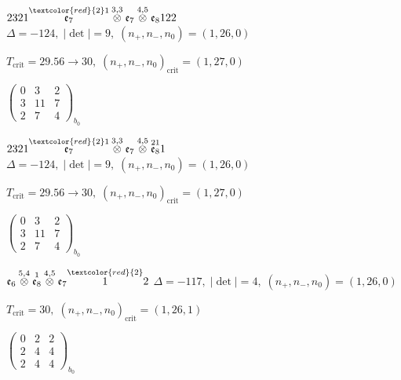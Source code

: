 \documentclass[10pt]{article}
\begin{document}
\smallskip

$2321\overset{\textcolor{red}{2}1}{\mathfrak{e}_7}\overset{3,3}{\otimes}\mathfrak{e}_7\overset{4,5}{\otimes}\mathfrak{e}_8122$ \quad $\Delta=-124,\; |\det|=9,\; (n_+,n_-,n_0)=(1,26,0)$

\hspace{1em}$T_{\text{crit}}=29.56 \to 30,\; (n_+,n_-,n_0)_{\text{crit}}=(1,27,0)$

\hspace{2em}$\left(\begin{smallmatrix}0 & 3 & 2 \\ 3 & 11 & 7 \\ 2 & 7 & 4\end{smallmatrix}\right)_{\!b_0}$

\smallskip

$2321\overset{\textcolor{red}{2}1}{\mathfrak{e}_7}\overset{3,3}{\otimes}\mathfrak{e}_7\overset{4,5}{\otimes}\overset{21}{\mathfrak{e}_8}1$ \quad $\Delta=-124,\; |\det|=9,\; (n_+,n_-,n_0)=(1,26,0)$

\hspace{1em}$T_{\text{crit}}=29.56 \to 30,\; (n_+,n_-,n_0)_{\text{crit}}=(1,27,0)$

\hspace{2em}$\left(\begin{smallmatrix}0 & 3 & 2 \\ 3 & 11 & 7 \\ 2 & 7 & 4\end{smallmatrix}\right)_{\!b_0}$

\smallskip

$\mathfrak{e}_6\overset{5,4}{\otimes}\overset{1}{\mathfrak{e}_8}\overset{4,5}{\otimes}\mathfrak{e}_7\overset{\textcolor{red}{2}}{1}2$ \quad $\Delta=-117,\; |\det|=4,\; (n_+,n_-,n_0)=(1,26,0)$

\hspace{1em}$T_{\text{crit}}=30,\; (n_+,n_-,n_0)_{\text{crit}}=(1,26,1)$

\hspace{2em}$\left(\begin{smallmatrix}0 & 2 & 2 \\ 2 & 4 & 4 \\ 2 & 4 & 4\end{smallmatrix}\right)_{\!b_0}$
\end{document}
